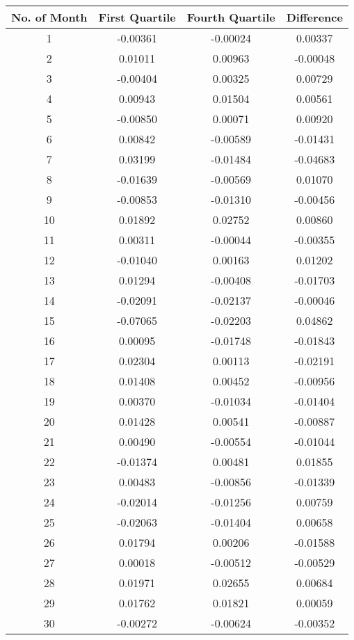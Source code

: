 \documentclass[11pt]{article}
\begin{document}
\begin{longtable}{cccc}
  \hline
No. of Month & First Quartile & Fourth Quartile & Difference \\ 
\hline
1 & -0.00361 & -0.00024 & 0.00337 \\ 
  2 & 0.01011 & 0.00963 & -0.00048 \\ 
  3 & -0.00404 & 0.00325 & 0.00729 \\ 
  4 & 0.00943 & 0.01504 & 0.00561 \\ 
  5 & -0.00850 & 0.00071 & 0.00920 \\ 
  6 & 0.00842 & -0.00589 & -0.01431 \\ 
  7 & 0.03199 & -0.01484 & -0.04683 \\ 
  8 & -0.01639 & -0.00569 & 0.01070 \\ 
  9 & -0.00853 & -0.01310 & -0.00456 \\ 
  10 & 0.01892 & 0.02752 & 0.00860 \\ 
  11 & 0.00311 & -0.00044 & -0.00355 \\ 
  12 & -0.01040 & 0.00163 & 0.01202 \\ 
  13 & 0.01294 & -0.00408 & -0.01703 \\ 
  14 & -0.02091 & -0.02137 & -0.00046 \\ 
  15 & -0.07065 & -0.02203 & 0.04862 \\ 
  16 & 0.00095 & -0.01748 & -0.01843 \\ 
  17 & 0.02304 & 0.00113 & -0.02191 \\ 
  18 & 0.01408 & 0.00452 & -0.00956 \\ 
  19 & 0.00370 & -0.01034 & -0.01404 \\ 
  20 & 0.01428 & 0.00541 & -0.00887 \\ 
  21 & 0.00490 & -0.00554 & -0.01044 \\ 
  22 & -0.01374 & 0.00481 & 0.01855 \\ 
  23 & 0.00483 & -0.00856 & -0.01339 \\ 
  24 & -0.02014 & -0.01256 & 0.00759 \\ 
  25 & -0.02063 & -0.01404 & 0.00658 \\ 
  26 & 0.01794 & 0.00206 & -0.01588 \\ 
  27 & 0.00018 & -0.00512 & -0.00529 \\ 
  28 & 0.01971 & 0.02655 & 0.00684 \\ 
  29 & 0.01762 & 0.01821 & 0.00059 \\ 
  30 & -0.00272 & -0.00624 & -0.00352 \\ 

\end{longtable}
\end{document}
